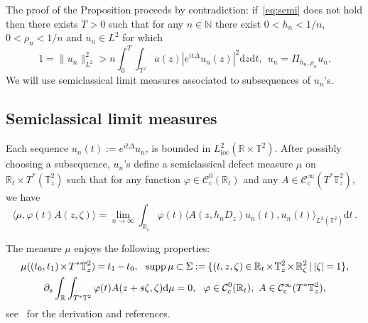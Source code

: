 \documentclass[11pt]{article}
\theoremstyle{definition}
\numberwithin{equation}{section}
\numberwithin{figure}{section}
\numberwithin{table}{section}
\DeclareMathOperator{\supp}{supp}
\newcommand{\CIc}{{\mathcal C}^\infty_{\mathrm{c}} }
\newcommand{\NN}{{\mathbb N}}
\newcommand{\R}{{\mathbb R}}
\newcommand{\TT}{{\mathbb T}}
\newcommand{\loc}{\mathrm{loc}}
\newcommand*{\dd}{\mathrm{d}}
\newcommand*{\dz}{\dd z}
\newcommand*{\dt}{\dd t}
\newcommand*{\dmu}{\dd \mu}
\newcommand*{\mk}{\mkern -1mu}
\newcommand*{\Mk}{\mkern -2mu}
\newcommand*{\tq}{\,|\,}
\begin{document}
The proof of the Proposition proceeds by contradiction: if~\eqref{eq:semi} does not hold then there exists $ T > 0 $ such that for any $ n \in \NN $ there exist $ 0 < h_n < 1/n $, $ 0 < \rho_n < 1/n $ and $ u_n \in L^2 $ for which
\begin{equation}\label{eq:contr}
1 = \| u_n \|_{ L^2 }^2 > n \int_0^T \!\!\int_{ \TT^2} a (z) | e^{ i t \Delta} u_n (z) |^2 \dz \dt, \ \ u_n = \Pi_{ h_n, \rho_n } u_n.
\end{equation}
We will use semiclassical limit measures associated to subsequences of $ u_n$'s.

\subsection{Semiclassical limit measures}

Each sequence $ u_n (t) := e^{ i t \Delta } u_n $, is bounded in $L^2_{\loc} (\mathbb{R} \times \TT^2)$. After possibly choosing a subsequence, $ u_n $'s define a semiclassical defect measure $\mu $ on $\R_t \times T^* (\TT^2_z)$ such that for any function $\varphi \in {\mathcal C}^0_{\mathrm{c}} (\R_t)$ and any $A\in \CIc (T^*\TT^2_z)$, we have
\begin{equation}\label{eq:mu}
\langle \mu, \varphi(t) A(z, \zeta)\rangle = \lim_{n\rightarrow \infty} \int_{\R_t } \varphi(t)
\langle A(z, h_{n} D_z) u_{n} (t), u_n (t)
\rangle_{ L^2 (\TT^2) } \dt \,.
\end{equation}

The measure $ \mu $ enjoys the following properties:
\begin{gather}\label{eq:propmu}
\begin{gathered}
\!\mu ((t_0, t_1) \Mk\times\Mk T^*\TT^2_z) \mk=\mk t_1 \mk-\mk t_0, \ \
\supp \mu \mk\subset\mk \Sigma \mk:=\mk \{(t,z, \zeta) \mk\in\mk \R_t \Mk\times\Mk \TT^2_z \Mk\times\Mk \R^2_\zeta \tq |\zeta|\mk=\mk 1\},\! \\
\partial_s \int_{\R} \int_{ T^* \TT^2 } \varphi(t) A (z + s \zeta, \zeta) \dmu = 0,
\ \ \varphi \in {\mathcal C}^0_{\mathrm{c}} (\R_t), \ A \in \CIc (T^*\TT^2_z),
\end{gathered}
\end{gather}
see~\cite{Ma} for the derivation and references.
\end{document}
